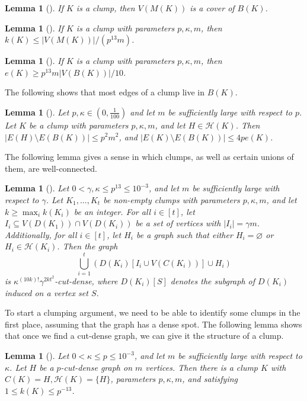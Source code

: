 \documentclass[10pt]{article}
\newtheorem{lemma}[theorem]{Lemma}
\theoremstyle{definition}
\newcommand\ab[1]{\lvert#1\rvert}
\let\leq\leqslant
\let\geq\geqslant
\begin{document}
\begin{lemma}[{\cite[Fact 4.2]{alexey}}]\label{pok4.2}
    If $K$ is a clump, then $V(M(K))$ is a cover of $B(K)$. 
\end{lemma}

\begin{lemma}[{\cite[Fact 4.3]{alexey}}]\label{pok4.3}
    If $K$ is a clump with parameters $p,\kappa,m$, then $k(K) \leq \ab{V(M(K))}/(p^{13}m)$.
\end{lemma}

\begin{lemma}[{\cite[Lemma 4.4]{alexey}}]\label{pok4.4}
    If $K$ is a clump with parameters $p,\kappa,m$, then $e(K)\geq p^{13} m\ab{V(B(K))}/10$.
\end{lemma}

The following shows that most edges of a clump live in $B(K)$.
\begin{lemma}[{\cite[Lemma 4.6]{alexey}}]\label{pok4.6}
    Let $p,\kappa \in (0,\frac{1}{100})$ and let $m$ be sufficiently large with respect to $p$. Let $K$ be a clump with parameters $p,\kappa,m$, and let $H \in \mathcal H(K)$. Then $\ab{E(H)\setminus E(B(K))}\leq p^2 m^2$, and $\ab{E(K)\setminus E(B(K))}\leq 4pe(K)$.
\end{lemma}
The following lemma gives a sense in which clumps, as well as certain unions of them, are well-connected.
\begin{lemma}[{\cite[Lemma 4.7]{alexey}}]\label{pok4.7}
    Let $0 <\gamma,\kappa \leq p^{13} \leq 10^{-3}$, and let $m$ be sufficiently large with respect to $\gamma$. Let $K_1,\dots,K_t$ be non-empty clumps with parameters $p,\kappa,m$, and let $k \geq \max_i k(K_i)$ be an integer. For all $i \in [t]$, let $I_i \subseteq V(D(K_1)) \cap V(D(K_i))$ be a set of vertices with $\ab{I_i}=\gamma m$. Additionally, for all $i \in [t]$, let $H_i$ be a graph such that either $H_i=\varnothing$ or $H_i \in \mathcal H(K_i)$. Then the graph $$\bigcup_{i=1}^t (D(K_i)[I_i \cup V(C(K_i))] \cup H_i)$$ is $\kappa^{(10k)!}\gamma^{2kt^2}$-cut-dense, where $D(K_i)[S]$ denotes the subgraph of $D(K_i)$ induced on a vertex set $S$.
\end{lemma}

To start a clumping argument, we need to be able to identify some clumps in the first place, assuming that the graph has a dense spot. The following lemma shows that once we find a cut-dense graph, we can give it the structure of a clump.
\begin{lemma}[{\cite[Lemma 4.8]{alexey}}]\label{pok4.8}
    Let $0 <\kappa \leq p \leq 10^{-3}$, and let $m$ be sufficiently large with respect to $\kappa$. Let $H$ be a $p$-cut-dense graph on $m$ vertices. Then there is a clump $K$ with $C(K)=H,\mathcal H(K)=\{H\}$, parameters $p,\kappa,m$, and satisfying $1 \leq k(K) \leq p^{-13}$. 
\end{lemma}
\end{document}
